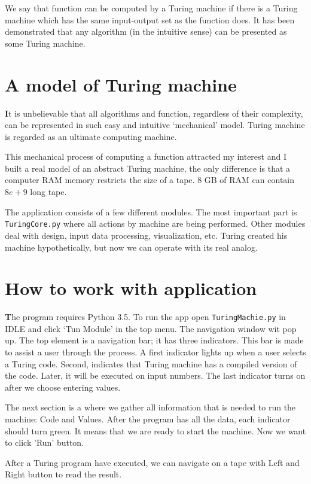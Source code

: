 \documentclass[12pt]{article}
\begin{document}
We say that function can be computed by a Turing machine if there is a Turing machine which has the same input-output set as the function does. It has been demonstrated that any algorithm (in the intuitive sense) can be presented as some Turing machine.

\section{A model of Turing machine}
\textbf{\large I}t is unbelievable that all algorithms and function, regardless of their complexity, can be represented in such easy and intuitive `mechanical' model. Turing machine is regarded as an ultimate computing machine.

This mechanical process of computing a function attracted my interest and I built a real model of an abstract Turing machine, the only difference is that a computer RAM memory restricts the size of a tape. 8 GB of RAM can contain $8e+9$ long tape. 

The application consists of a few different modules. The most important part is \verb|TuringCore.py| where all actions by machine are being performed. Other modules deal with design, input data processing, visualization, etc. Turing created his machine hypothetically, but now we can operate with its real analog.

\section{How to work with application}
\textbf{\large T}he program requires Python 3.5. To run the app open \verb|TuringMachie.py| in IDLE and click `Tun Module' in the top menu. The navigation window wit pop up. The top element is a navigation bar; it has three indicators. This bar is made to assist a user through the process. A first indicator lights up when a user selects a Turing code. Second, indicates that Turing machine has a compiled version of the code. Later, it will be executed on input numbers. The last indicator turns on after we choose entering values.

The next section is a where we gather all information that is needed to run the machine: Code and Values. After the program has all the data, each indicator should turn green. It means that we are ready to start the machine. Now we want to click 'Run' button.

After a Turing program have executed, we can navigate on a tape with Left and Right button to read the result.
\end{document}
